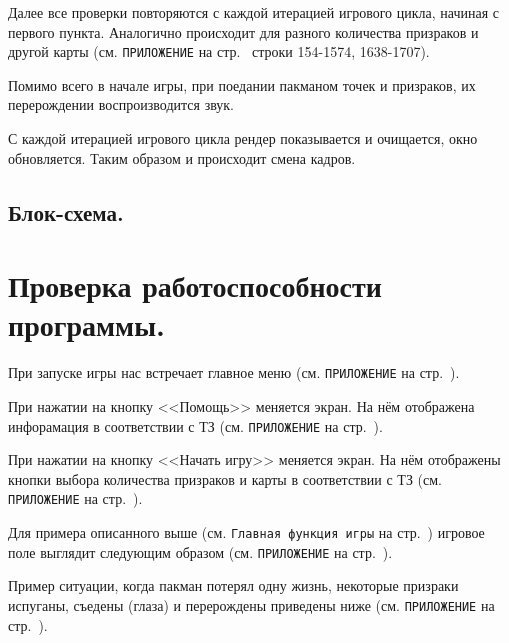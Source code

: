 Далее все проверки повторяются с каждой итерацией игрового цикла, начиная с первого пункта. Аналогично происходит для разного количества призраков и другой карты (см. \texttt{ПРИЛОЖЕНИЕ} на стр.~\pageref{code:main} строки 154-1574, 1638-1707).

Помимо всего в начале игры, при поедании пакманом точек и призраков, их перерождении воспроизводится звук.

С каждой итерацией игрового цикла рендер показывается и очищается, окно обновляется. Таким образом и происходит смена кадров.

\subsection{\label{subsec:ch02/sec01/sub08}Блок-схема.}

\section{\label{sec:ch02/sec02}Проверка работоспособности программы.}
При запуске игры нас встречает главное меню (см. \texttt{ПРИЛОЖЕНИЕ} на стр.~\pageref{fig2}).

При нажатии на кнопку <<Помощь>> меняется экран. На нём отображена инфорамация в соответствии с ТЗ (см. \texttt{ПРИЛОЖЕНИЕ} на стр.~\pageref{fig3}).

При нажатии на кнопку <<Начать игру>> меняется экран. На нём отображены кнопки выбора количества призраков и карты в соответствии с ТЗ (см. \texttt{ПРИЛОЖЕНИЕ} на стр.~\pageref{fig4}).

Для примера описанного выше (см. \texttt{Главная функция игры} на стр.~\pageref{subsec:ch02/sec01/sub07}) игровое поле выглядит следующим образом (см. \texttt{ПРИЛОЖЕНИЕ} на стр.~\pageref{fig5}).

Пример ситуации, когда пакман потерял одну жизнь, некоторые призраки испуганы, съедены (глаза) и перерождены приведены ниже (см. \texttt{ПРИЛОЖЕНИЕ} на стр.~\pageref{fig6}).